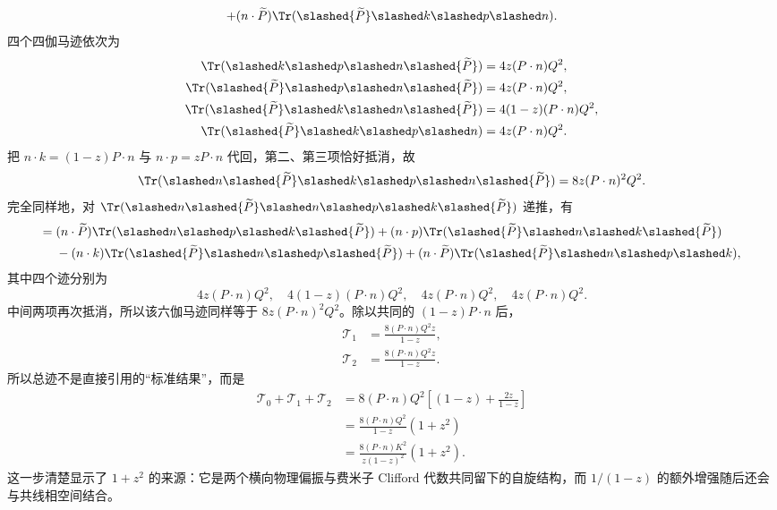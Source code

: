 \begin{derivation}[夸克共线发射的分裂概率]
\begin{align*}
+(n\cdot\widetilde P)\Tr(\slashed{\widetilde P}\slashed k\slashed p\slashed n).
\end{align*}
四个四伽马迹依次为
\begin{align*}
\Tr(\slashed k\slashed p\slashed n\slashed{\widetilde P})&=4z(P\cdot n)Q^2,\\
\Tr(\slashed{\widetilde P}\slashed p\slashed n\slashed{\widetilde P})&=4z(P\cdot n)Q^2,\\
\Tr(\slashed{\widetilde P}\slashed k\slashed n\slashed{\widetilde P})&=4(1-z)(P\cdot n)Q^2,\\
\Tr(\slashed{\widetilde P}\slashed k\slashed p\slashed n)&=4z(P\cdot n)Q^2.
\end{align*}
把 $n\cdot k=(1-z)P\cdot n$ 与 $n\cdot p=zP\cdot n$ 代回，第二、第三项恰好抵消，故
\begin{equation*}
\Tr(\slashed n\slashed{\widetilde P}\slashed k\slashed p
\slashed n\slashed{\widetilde P})
=8z(P\cdot n)^2Q^2.
\end{equation*}
完全同样地，对
\(\Tr(\slashed n\slashed{\widetilde P}\slashed n\slashed p
\slashed k\slashed{\widetilde P})\) 递推，有
\begin{align*}
={}&(n\cdot\widetilde P)\Tr(\slashed n\slashed p\slashed k\slashed{\widetilde P})
+(n\cdot p)\Tr(\slashed{\widetilde P}\slashed n\slashed k\slashed{\widetilde P})\\
&-(n\cdot k)\Tr(\slashed{\widetilde P}\slashed n\slashed p\slashed{\widetilde P})
+(n\cdot\widetilde P)\Tr(\slashed{\widetilde P}\slashed n\slashed p\slashed k),
\end{align*}
其中四个迹分别为
\begin{equation*}
4z(P\cdot n)Q^2,
\quad4(1-z)(P\cdot n)Q^2,
\quad4z(P\cdot n)Q^2,
\quad4z(P\cdot n)Q^2.
\end{equation*}
中间两项再次抵消，所以该六伽马迹同样等于
\(8z(P\cdot n)^2Q^2\)。除以共同的
$(1-z)P\cdot n$ 后，
\begin{align*}
\mathcal T_1
&=\frac{8(P\cdot n)Q^2z}{1-z},\\
\mathcal T_2
&=\frac{8(P\cdot n)Q^2z}{1-z}.
\end{align*}
所以总迹不是直接引用的“标准结果”，而是
\begin{align*}
\mathcal T_0+\mathcal T_1+\mathcal T_2
&=8(P\cdot n)Q^2
\left[(1-z)+\frac{2z}{1-z}\right]\\
&=\frac{8(P\cdot n)Q^2}{1-z}(1+z^2)\\
&=\frac{8(P\cdot n)K^2}{z(1-z)^2}(1+z^2).
\end{align*}
这一步清楚显示了 $1+z^2$ 的来源：它是两个横向物理偏振与费米子 Clifford 代数共同留下的自旋结构，而 $1/(1-z)$ 的额外增强随后还会与共线相空间结合。


\end{derivation}
